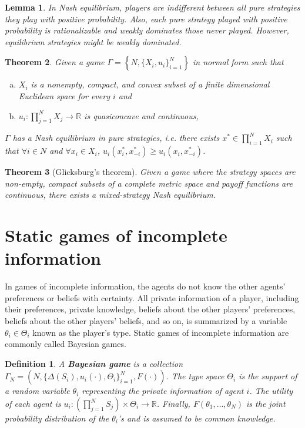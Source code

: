 \documentclass[letter, 10pt]{article}
\theoremstyle{basic}
\newtheorem{definition}{Definition}[section]
\newtheorem{theorem}{Theorem}[section]
\newtheorem{lemma}[theorem]{Lemma}
\newcommand{\R}{\mathbb{R}}
\begin{document}
\begin{spacing}{1.1}
\begin{lemma}
  In Nash equilibrium, players are indifferent between all pure strategies
  they play with positive probability. Also, each pure strategy played with
  positive probability is rationalizable and weakly dominates those never
  played. However, equilibrium strategies might be weakly dominated.
\end{lemma}

\begin{theorem}
  Given a game $\Gamma = \left\{N, \{X_i, u_i\}_{i=1}^N\right\}$ in normal
  form such that
  \begin{enumerate}[a)]\leftskip = 1em
  \item $X_i$ is a nonempty, compact, and convex subset of a finite
    dimensional Euclidean space for every $i$ and
  \item $u_i : \prod_{j=1}^N X_j \to \R$ is quasiconcave and continuous,
  \end{enumerate}
  $\Gamma$ has a Nash equilibrium in pure strategies, i.e. there exists
  $x^* \in \prod_{i=1}^N X_i$ such that $\forall i \in N$ and $\forall
  x_i\in X_i$, $ u_i(x_i^*, x_{-i}^*) \geq u_i(x_i, x_{-i}^*)$.
\end{theorem}

\begin{theorem}[Glicksburg's theorem]
  Given a game where the strategy spaces are
  non-empty, compact subsets of a complete metric space and payoff
  functions are continuous, there exists a mixed-strategy Nash equilibrium.
\end{theorem}

\section{Static games of incomplete information}

In games of incomplete information, the agents do not know the other
agents' preferences or beliefs with certainty. All private information of a
player, including their preferences, private knowledge, beliefs about the
other players' preferences, beliefs about the other players' beliefs, and
so on, is summarized by a variable $\theta_i \in \Theta_i$ known as the
player's type. Static games of incomplete information are commonly called
Bayesian games.

\begin{definition}
  A \textbf{Bayesian game} is a collection $\Gamma_N = \left(N, \{\Delta(S_i),
    u_i(\cdot), \Theta_i\}_{i=1}^N, F(\cdot)\right)$. The type space $\Theta_i$
  is the support of a random variable $\theta_i$ representing the private
  information of agent $i$.  The utility of each agent is $u_i: \left(
    \prod_{j=1}^N S_j\right) \times \Theta_i  \to \R$. Finally, $F(\theta_1, \ldots, \theta_N)$ is the
  joint probability distribution of the $\theta_i$'s and is assumed to be
  common knowledge.
\end{definition}


\end{spacing}
\end{document}
